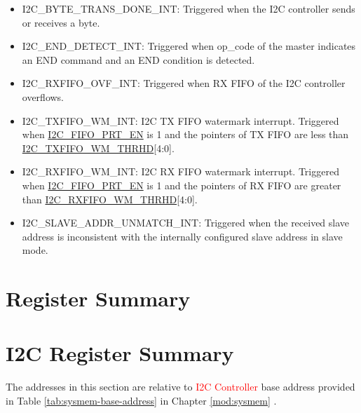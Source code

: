 \documentclass[main\_\_EN.tex]{subfiles}
\begin{document}
\begin{itemize}
\item \label{int:i2c-byte-trans-done}I2C\_BYTE\_TRANS\_DONE\_INT: Triggered when the I2C controller sends or receives a byte.
\item \label{int:i2c-end}I2C\_END\_DETECT\_INT: Triggered when op\_code of the master indicates an END command and an END condition is detected.
\item \label{int:i2c-rxfifo-ovf}I2C\_RXFIFO\_OVF\_INT: Triggered when RX FIFO of the I2C controller overflows.
\item \label{int:i2c-txfifo-wm}I2C\_TXFIFO\_WM\_INT: I2C TX FIFO watermark interrupt. Triggered when \hyperref[fielddesc:I2CFIFOPRTEN]{I2C\_FIFO\_PRT\_EN} is 1 and the pointers of TX FIFO are less than \hyperref[fielddesc:I2CTXFIFOWMTHRHD]{I2C\_TXFIFO\_WM\_THRHD}[4:0].
\item \label{int:i2c-rxfifo-wm}I2C\_RXFIFO\_WM\_INT: I2C RX FIFO watermark interrupt. Triggered when \hyperref[fielddesc:I2CFIFOPRTEN]{I2C\_FIFO\_PRT\_EN} is 1 and the pointers of RX FIFO are greater than \hyperref[fielddesc:I2CRXFIFOWMTHRHD]{I2C\_RXFIFO\_WM\_THRHD}[4:0].
\item I2C\_SLAVE\_ADDR\_UNMATCH\_INT: Triggered when the received slave address is inconsistent with the internally configured slave address in slave mode.
\end{itemize}





\clearpage
\section{Register Summary}

\section{I2C Register Summary}
\label{sec:i2c-reg-summ}
\hypertarget{i2c-reg-summ}{}

The addresses in this section are relative to \textcolor{red}{I2C Controller} base address provided in Table \ref{tab:sysmem-base-address} in Chapter \ref{mod:sysmem} \textit{}.
\end{document}
